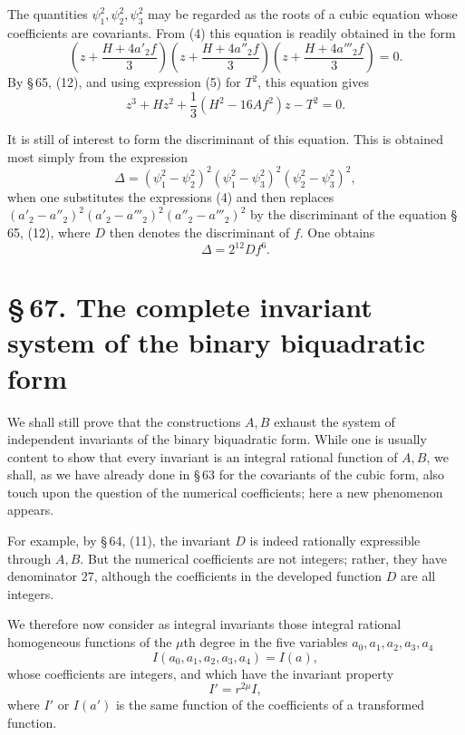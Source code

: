 \documentclass[11pt]{article}
\newcommand{\sect}[2]{\section*{\S\,#1. #2}}
\begin{document}
The quantities $\psi_1^2,\psi_2^2,\psi_3^2$ may be regarded as the roots of a cubic equation whose coefficients are covariants. From (4) this equation is readily obtained in the form
\[
 \left(z+\frac{H+4a'_2f}{3}\right)
 \left(z+\frac{H+4a''_2f}{3}\right)
 \left(z+\frac{H+4a'''_2f}{3}\right)=0.
\]
By \S\,65, (12), and using expression (5) for $T^2$, this equation gives
\begin{equation}
 z^3+Hz^2+\frac13(H^2-16Af^2)z-T^2=0.
\tag{7}
\end{equation}

It is still of interest to form the discriminant of this equation. This is obtained most simply from the expression
\[
 \Delta=(\psi_1^2-\psi_2^2)^2(\psi_1^2-\psi_3^2)^2(\psi_2^2-\psi_3^2)^2,
\]
when one substitutes the expressions (4) and then replaces $(a'_2-a''_2)^2(a'_2-a'''_2)^2(a''_2-a'''_2)^2$ by the discriminant of the equation \S\,65, (12), where $D$ then denotes the discriminant of $f$. One obtains
\begin{equation}
 \Delta=2^{12}Df^6.
\tag{8}
\end{equation}

\sect{67}{The complete invariant system of the binary biquadratic form}

We shall still prove that the constructions $A,B$ exhaust the system of independent invariants of the binary biquadratic form. While one is usually content to show that every invariant is an integral rational function of $A,B$, we shall, as we have already done in \S\,63 for the covariants of the cubic form, also touch upon the question of the numerical coefficients; here a new phenomenon appears.

For example, by \S\,64, (11), the invariant $D$ is indeed rationally expressible through $A,B$. But the numerical coefficients are not integers; rather, they have denominator $27$, although the coefficients in the developed function $D$ are all integers.

We therefore now consider as integral invariants those integral rational homogeneous functions of the $\mu$th degree in the five variables $a_0,a_1,a_2,a_3,a_4$
\begin{equation}
 I(a_0,a_1,a_2,a_3,a_4)=I(a),
\tag{1}
\end{equation}
whose coefficients are integers, and which have the invariant property
\begin{equation}
 I'=r^{2\mu}I,
\tag{2}
\end{equation}
where $I'$ or $I(a')$ is the same function of the coefficients of a transformed function.
\end{document}
